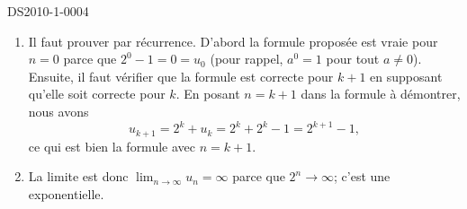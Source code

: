 
\begin{corrige}{DS2010-1-0004}

	\begin{enumerate}
		\item
			Il faut prouver par récurrence. D'abord la formule proposée est vraie pour $n=0$ parce que $2^0-1=0=u_0$ (pour rappel, $a^0=1$ pour tout $a\neq 0$). Ensuite, il faut vérifier que la formule est correcte pour $k+1$ en supposant qu'elle soit correcte pour $k$. En posant $n=k+1$ dans la formule à démontrer, nous avons
			\begin{equation}
			  u_{k+1}=2^k+u_k=2^k+2^k-1=2^{k+1}-1,
			\end{equation}
			ce qui est bien la formule avec $n=k+1$. 
		\item
			La limite est donc $\lim_{n\to \infty} u_n=\infty$ parce que $2^n\to\infty$; c'est une exponentielle.
	\end{enumerate}

\end{corrige}

